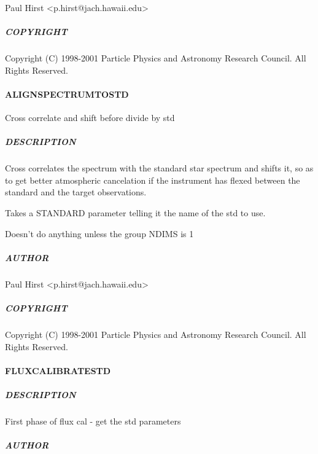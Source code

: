 \documentclass[twoside,11pt]{article}
\renewcommand{\_}{\texttt{\symbol{95}}}
\begin{document}
Paul Hirst <p.hirst@jach.hawaii.edu>

\subparagraph*{COPYRIGHT\label{_DIVIDE_BY_STANDARD__COPYRIGHT}}

Copyright (C) 1998-2001 Particle Physics and Astronomy Research
Council. All Rights Reserved.

\paragraph*{\_ALIGN\_SPECTRUM\_TO\_STD\_\label{_ALIGN_SPECTRUM_TO_STD_}}

Cross correlate and shift before divide by std

\subparagraph*{DESCRIPTION\label{_ALIGN_SPECTRUM_TO_STD__DESCRIPTION}}

Cross correlates the spectrum with the standard star spectrum and shifts
it, so as to get better atmospheric cancelation if the instrument has
flexed between the standard and the target observations.



Takes a STANDARD parameter telling it the name of the std to use.



Doesn't do anything unless the group NDIMS is 1

\subparagraph*{AUTHOR\label{_ALIGN_SPECTRUM_TO_STD__AUTHOR}}

Paul Hirst <p.hirst@jach.hawaii.edu>

\subparagraph*{COPYRIGHT\label{_ALIGN_SPECTRUM_TO_STD__COPYRIGHT}}

Copyright (C) 1998-2001 Particle Physics and Astronomy Research
Council. All Rights Reserved.

\paragraph*{\_FLUX\_CALIBRATE\_STD\_\label{_FLUX_CALIBRATE_STD_}}



\subparagraph*{DESCRIPTION\label{_FLUX_CALIBRATE_STD__DESCRIPTION}}

First phase of flux cal - get the std parameters

\subparagraph*{AUTHOR\label{_FLUX_CALIBRATE_STD__AUTHOR}}
\end{document}
